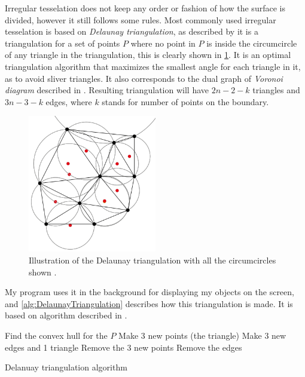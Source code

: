 \documentclass[a4paper,12pt]{extarticle}
\begin{document}
Irregular tesselation does not keep any order or fashion of how the surface is divided, however it still follows some rules. Most commonly used irregular tesselation is based on \emph{Delaunay triangulation}, as described by \citep[Chap 9.2]{Schwarzkopf1997} it is a triangulation for a set of points $P$ where no point in $P$ is inside the circumcircle of any triangle in the triangulation, this is clearly shown in \cref{fig:Circumcircle}. It is an optimal triangulation algorithm that maximizes the smallest angle for each triangle in it, as to avoid sliver triangles. It also corresponds to the dual graph of \emph{Voronoi diagram} described in \citep[Chap 7.1]{Schwarzkopf1997}. Resulting triangulation will have $2n-2-k$ triangles and $3n-3-k$ edges, where $k$ stands for number of points on the boundary.

\begin{figure}[H]
  \centering
  \includegraphics[width=0.5\textwidth]{Circumcircle.png}
  \caption{Illustration of the Delaunay triangulation with all the circumcircles shown \citep{NuEs:2016}.}
  \label{fig:Circumcircle}
\end{figure}

My program uses it in the background for displaying my objects on the screen, and \cref{alg:DelaunayTriangulation} describes how this triangulation is made. It is based on algorithm described in \citep[Chap 9.3]{Schwarzkopf1997}.

\begin{algorithm}
  \SetAlgoLined
  Find the convex hull for the $P$\;
  Make 3 new points (the triangle)\;
  Make 3 new edges and 1 triangle\;
  Remove the 3 new points\;
  Remove the edges\;
  \caption{Delanuay triangulation algorithm}
  \label{alg:DelaunayTriangulation}
\end{algorithm}
 
\end{document}
